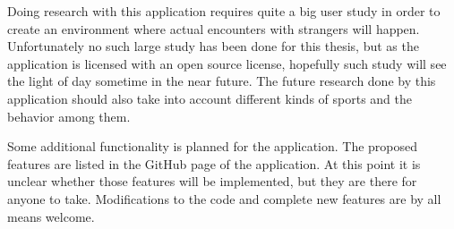 Doing research with this application requires quite a big user study in order to create an environment where actual encounters with strangers will happen. Unfortunately no such large study has been done for this thesis, but as the application is licensed with an open source license, hopefully such study will see the light of day sometime in the near future. The future research done by this application should also take into account different kinds of sports and the 	behavior among them.

Some additional functionality is planned for the application. The proposed features are listed in the GitHub page of the application. At this point it is unclear whether those features will be implemented, but they are there for anyone to take. Modifications to the code and complete new features are by all means welcome.

